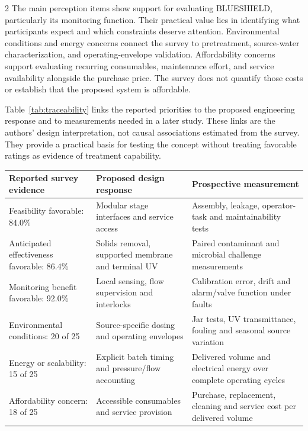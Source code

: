 \documentclass{ieeeaccess}
\makeatletter
\newenvironment{inlinetable}{\par\addvspace{6pt plus 10pt minus 2pt}\noindent\begin{minipage}{\linewidth}\def\@captype{table}\centering}{\end{minipage}\par\addvspace{7pt plus 10pt minus 2pt}}
\makeatother
\begin{document}
\begin{multicols}{2}
The main perception items show support for evaluating BLUESHIELD, particularly its monitoring function. Their practical value lies in identifying what participants expect and which constraints deserve attention. Environmental conditions and energy concerns connect the survey to pretreatment, source-water characterization, and operating-envelope validation. Affordability concerns support evaluating recurring consumables, maintenance effort, and service availability alongside the purchase price. The survey does not quantify those costs or establish that the proposed system is affordable.

Table~\ref{tab:traceability} links the reported priorities to the proposed engineering response and to measurements needed in a later study. These links are the authors' design interpretation, not causal associations estimated from the survey. They provide a practical basis for testing the concept without treating favorable ratings as evidence of treatment capability.

\end{multicols}
\begin{inlinetable}
\caption{From reported survey priorities to prospective design evaluation. Percentages and counts retain the source limitations; design responses are proposed interpretations.}
\label{tab:traceability}\vspace{-6pt}
\centering\small
\renewcommand{\arraystretch}{1.00}
\begin{tabular}{p{}p{}p{}}
\toprule
Reported survey evidence & Proposed design response & Prospective measurement\\
\midrule
Feasibility favorable: 84.0\% & Modular stage interfaces and service access & Assembly, leakage, operator-task and maintainability tests\\
Anticipated effectiveness favorable: 86.4\% & Solids removal, supported membrane and terminal UV & Paired contaminant and microbial challenge measurements\\
Monitoring benefit favorable: 92.0\% & Local sensing, flow supervision and interlocks & Calibration error, drift and alarm/valve function under faults\\
Environmental conditions: 20 of 25 & Source-specific dosing and operating envelopes & Jar tests, UV transmittance, fouling and seasonal source variation\\
Energy or scalability: 15 of 25 & Explicit batch timing and pressure/flow accounting & Delivered volume and electrical energy over complete operating cycles\\
Affordability concern: 18 of 25 & Accessible consumables and service provision & Purchase, replacement, cleaning and service cost per delivered volume\\
\bottomrule
\end{tabular}\vspace{6pt}
\end{inlinetable}
\end{document}
